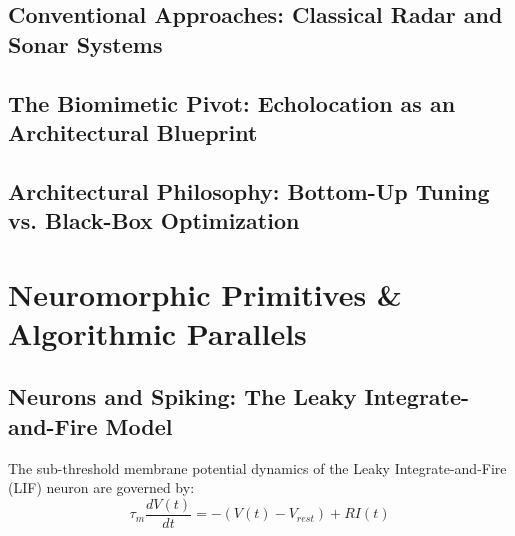 \documentclass[12pt,a4paper]{report}
\begin{document}
\section{Conventional Approaches: Classical Radar and Sonar Systems}

\section{The Biomimetic Pivot: Echolocation as an Architectural Blueprint}

\section{Architectural Philosophy: Bottom-Up Tuning vs. Black-Box Optimization}

\chapter{Neuromorphic Primitives \& Algorithmic Parallels}
\label{ch:primitives}

\section{Neurons and Spiking: The Leaky Integrate-and-Fire Model}
The sub-threshold membrane potential dynamics of the Leaky Integrate-and-Fire (LIF) neuron are governed by:
\begin{equation}
    \tau_m \frac{dV(t)}{dt} = -(V(t) - V_{rest}) + R I(t)
\end{equation}
\end{document}

